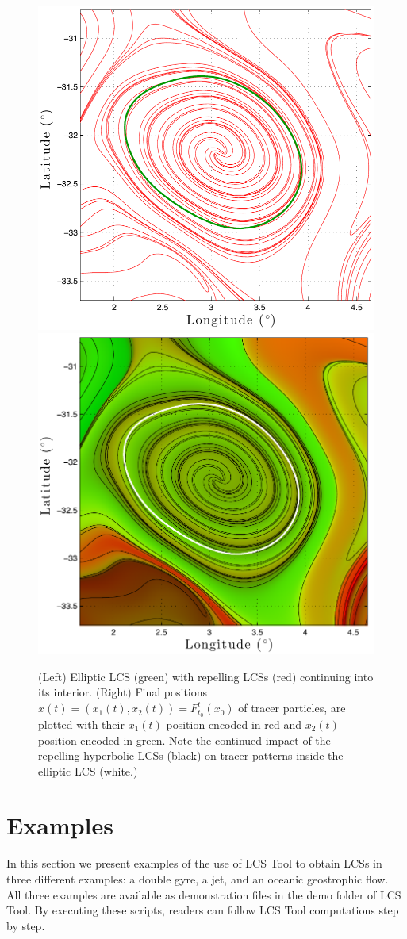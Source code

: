\documentclass{article}
\begin{document}
\begin{figure}[hbt]
\centering
\includegraphics[width=.49\textwidth]{graphics/ocean_dataset/LCS_fwd_coherent_eddy}
\includegraphics[width=.49\textwidth]{graphics/ocean_dataset/LCS_fwd_colortracer}
\caption{(Left) Elliptic LCS (green) with repelling LCSs (red) continuing into its interior. (Right) Final positions $x(t) = (x_1(t),x_2(t)) = F_{t_0}^t(x_0)$ of tracer particles, are plotted with their $x_1(t)$ position encoded in red and $x_2(t)$ position encoded in green. Note the continued impact of the repelling hyperbolic LCSs (black) on tracer patterns inside the elliptic LCS (white.)}
\label{fig:ocean_dataset_colortracer}
\end{figure}

\clearpage

\section{Examples}

In this section we present examples of the use of LCS Tool to obtain LCSs in three different examples: a double gyre, a jet, and an oceanic geostrophic flow. All three examples are available as demonstration files in the demo folder of LCS Tool. By executing these scripts, readers can follow LCS Tool computations step by step.
\end{document}
